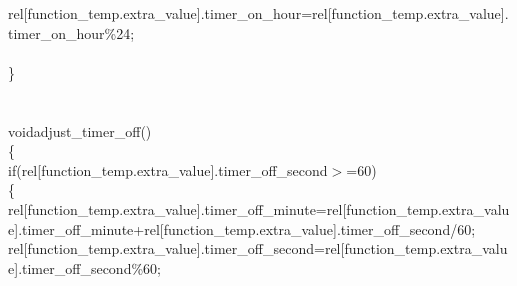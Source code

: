 \documentclass[a4paper, 12pt]{article}
\newcommand\SPC{\hspace*{0.6em}}
\newcommand{\CppAIdentifier}[1]{\textcolor[rgb]{0,1,0}{#1}}
\newcommand{\CppANumber}[1]{\textcolor[rgb]{0,0,1}{#1}}
\newcommand{\CppAReservedWord}[1]{\textcolor[rgb]{0,0.5,0}{#1}}
\newcommand{\CppASpace}[1]{\textcolor[rgb]{1,1,1}{\colorbox[rgb]{0,0,0}{#1}}}
\newcommand{\CppASymbol}[1]{\textcolor[rgb]{1,0,0}{#1}}
\begin{document}
\begin{ttfamily}
\CppASpace{\SPC \SPC }\CppAIdentifier{rel}\CppASymbol{[}\CppAIdentifier{function\_temp}\CppASymbol{.}\CppAIdentifier{extra\_value}\CppASymbol{]}\CppASymbol{.}\CppAIdentifier{timer\_on\_hour}\CppASpace{\SPC }\CppASymbol{=}\CppASpace{\SPC }\CppAIdentifier{rel}\CppASymbol{[}\CppAIdentifier{function\_temp}\CppASymbol{.}\CppAIdentifier{extra\_value}\CppASymbol{]}\CppASymbol{.}\CppAIdentifier{timer\_on\_hour}\CppASpace{\SPC }\CppASymbol{\%}\CppASpace{\SPC }\CppANumber{24}\CppASymbol{;}\\
\\
\CppASymbol{\}}\\
\\
\\
\CppAReservedWord{void}\CppASpace{\SPC }\CppAIdentifier{adjust\_timer\_off}\CppASymbol{(}\CppASymbol{)}\\
\CppASymbol{\{}\CppASpace{\SPC }\\
\CppASpace{\SPC \SPC \SPC \SPC }\CppAReservedWord{if}\CppASymbol{(}\CppAIdentifier{rel}\CppASymbol{[}\CppAIdentifier{function\_temp}\CppASymbol{.}\CppAIdentifier{extra\_value}\CppASymbol{]}\CppASymbol{.}\CppAIdentifier{timer\_off\_second}\CppASpace{\SPC }\CppASymbol{$>$=}\CppASpace{\SPC }\CppANumber{60}\CppASymbol{)}\\
\CppASpace{\SPC \SPC }\CppASymbol{\{}\CppASpace{\SPC \SPC }\\
\CppASpace{\SPC \SPC \SPC }\CppAIdentifier{rel}\CppASymbol{[}\CppAIdentifier{function\_temp}\CppASymbol{.}\CppAIdentifier{extra\_value}\CppASymbol{]}\CppASymbol{.}\CppAIdentifier{timer\_off\_minute}\CppASpace{\SPC \SPC }\CppASymbol{=}\CppASpace{\SPC }\CppAIdentifier{rel}\CppASymbol{[}\CppAIdentifier{function\_temp}\CppASymbol{.}\CppAIdentifier{extra\_value}\CppASymbol{]}\CppASymbol{.}\CppAIdentifier{timer\_off\_minute}\CppASpace{\SPC }\CppASymbol{+}\CppASpace{\SPC }\CppAIdentifier{rel}\CppASymbol{[}\CppAIdentifier{function\_temp}\CppASymbol{.}\CppAIdentifier{extra\_value}\CppASymbol{]}\CppASymbol{.}\CppAIdentifier{timer\_off\_second}\CppASpace{\SPC }\CppASymbol{/}\CppASpace{\SPC }\CppANumber{60}\CppASymbol{;}\\
\CppASpace{\SPC \SPC \SPC }\CppAIdentifier{rel}\CppASymbol{[}\CppAIdentifier{function\_temp}\CppASymbol{.}\CppAIdentifier{extra\_value}\CppASymbol{]}\CppASymbol{.}\CppAIdentifier{timer\_off\_second}\CppASpace{\SPC }\CppASymbol{=}\CppASpace{\SPC }\CppAIdentifier{rel}\CppASymbol{[}\CppAIdentifier{function\_temp}\CppASymbol{.}\CppAIdentifier{extra\_value}\CppASymbol{]}\CppASymbol{.}\CppAIdentifier{timer\_off\_second}\CppASpace{\SPC }\CppASymbol{\%}\CppASpace{\SPC }\CppANumber{60}\CppASymbol{;}\\

\end{ttfamily}
\end{document}
